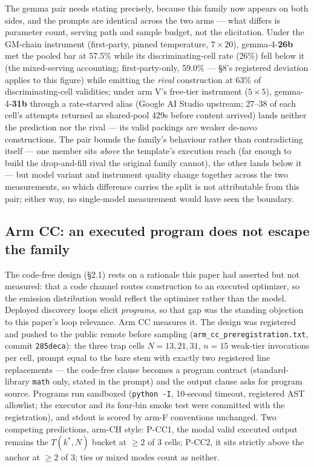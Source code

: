 The gemma pair needs stating precisely, because this family now appears on both sides, and
the prompts are identical across the two arms --- what differs is parameter count, serving
path and sample budget, not the elicitation. Under the GM-chain instrument (first-party,
pinned temperature, $7 \times 20$), gemma-4-\textbf{26b} met the pooled bar at 57.5\% while its discriminating-cell rate (26\%) fell below it (the mixed-serving
accounting; first-party-only, 59.0\% --- \S8's registered deviation applies to this figure)
while emitting the \emph{rival} construction at 63\% of discriminating-cell validities; under arm
V's free-tier instrument ($5 \times 5$), gemma-4-\textbf{31b} through a rate-starved alias (Google AI
Studio upstream; 27--38 of each cell's attempts returned as shared-pool 429s before content
arrived) lands neither the prediction nor the rival --- its valid packings are weaker de-novo
constructions. The pair bounds the family's behaviour rather than contradicting itself ---
one member sits \emph{above} the template's execution reach (far enough to build the
drop-and-fill rival the original family cannot), the other lands below it --- but model
variant and instrument quality change together across the two measurements, so which
difference carries the split is not attributable from this pair; either way, no
single-model measurement would have seen the boundary.

\subsection{Arm CC: an executed program does not escape the family}

The code-free design (\S2.1) rests on a rationale this paper had asserted but not measured:
that a code channel routes construction to an executed optimizer, so the emission distribution
would reflect the optimizer rather than the model. Deployed discovery loops elicit
\emph{programs}, so that gap was the standing objection to this paper's loop relevance. Arm CC
measures it. The design was registered and pushed to the public remote before sampling
(\texttt{arm\_cc\_preregistration.txt}, commit \texttt{285deca}): the three trap cells
$N = 13, 21, 31$, $n = 15$ weak-tier invocations per cell, prompt equal to the bare stem with
exactly two registered line replacements --- the code-free clause becomes a program contract
(standard-library \texttt{math} only, stated in the prompt) and the output clause asks for
program source. Programs run sandboxed (\texttt{python -I}, 10-second timeout, registered AST
allowlist; the executor and its four-bin smoke test were committed with the registration), and
stdout is scored by arm-F conventions unchanged. Two competing predictions, arm-CH style:
P-CC1, the modal valid executed output remains the $T(k^*, N)$ bucket at $\ge 2$ of 3 cells;
P-CC2, it sits strictly above the anchor at $\ge 2$ of 3; ties or mixed modes count as neither.

